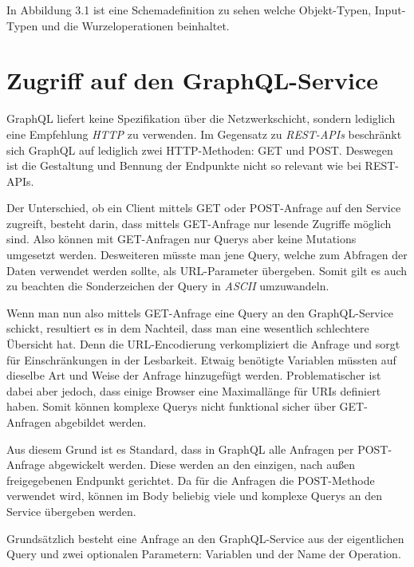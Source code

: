 In Abbildung 3.1 ist eine Schemadefinition zu sehen welche Objekt-Typen, Input-Typen und die Wurzeloperationen beinhaltet.

\section{Zugriff auf den GraphQL-Service}
GraphQL liefert keine Spezifikation über die Netzwerkschicht, sondern lediglich eine Empfehlung \textit{HTTP} zu verwenden.
Im Gegensatz zu \textit{REST-APIs} beschränkt sich GraphQL auf lediglich zwei HTTP-Methoden: GET und POST.
Deswegen ist die Gestaltung und Bennung der Endpunkte nicht so relevant wie bei REST-APIs.
\newline

Der Unterschied, ob ein Client mittels GET oder POST-Anfrage auf den Service zugreift, besteht darin, dass mittels GET-Anfrage nur lesende Zugriffe möglich sind.
Also können mit GET-Anfragen nur Querys aber keine Mutations umgesetzt werden.
Desweiteren müsste man jene Query, welche zum Abfragen der Daten verwendet werden sollte, als URL-Parameter übergeben.
Somit gilt es auch zu beachten die Sonderzeichen der Query in \textit{ASCII} umzuwandeln.
\newline

Wenn man nun also mittels GET-Anfrage eine Query an den GraphQL-Service schickt, resultiert es in dem Nachteil, dass man eine wesentlich schlechtere Übersicht hat. 
Denn die URL-Encodierung verkompliziert die Anfrage und sorgt für Einschränkungen in der Lesbarkeit.
Etwaig benötigte Variablen müssten auf dieselbe Art und Weise der Anfrage hinzugefügt werden.
Problematischer ist dabei aber jedoch, dass einige Browser eine Maximallänge für URIs definiert haben.
Somit können komplexe Querys nicht funktional sicher über GET-Anfragen abgebildet werden.
\newline

Aus diesem Grund ist es Standard, dass in GraphQL alle Anfragen per POST-Anfrage abgewickelt werden.
Diese werden an den einzigen, nach außen freigegebenen Endpunkt gerichtet.
Da für die Anfragen die POST-Methode verwendet wird, können im Body beliebig viele und komplexe Querys an den Service übergeben werden.
\newline

Grundsätzlich besteht eine Anfrage an den GraphQL-Service aus der eigentlichen Query und zwei optionalen Parametern: Variablen und der Name der Operation.



